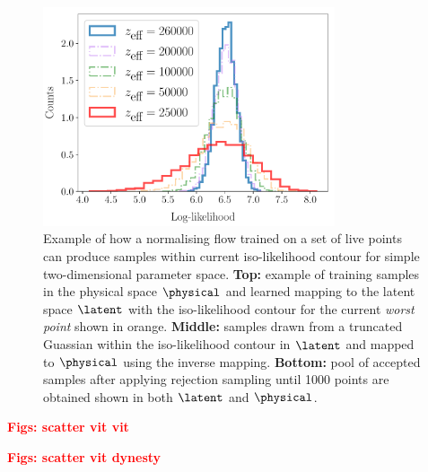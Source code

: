 \documentclass[aps,superscriptaddress,twocolumn,nopreprintnumbers,floatfix,groupedaddress]{revtex4-1}
\newcommand{\figwidth}{8.6cm}
\begin{document}
\begin{figure}
	\centering
	\includegraphics[width=\figwidth]{figs/hists_rect.pdf}
	\caption{Example of how a normalising flow trained on a set of live points can produce samples within current iso-likelihood contour for simple two-dimensional parameter space. \textbf{Top:} example of training samples in the physical space $\physical$ and learned mapping to the latent space $\latent$ with the iso-likelihood contour for the current \textit{worst point} shown in orange. \textbf{Middle:} samples drawn from a truncated Guassian within the iso-likelihood contour in $\latent$ and mapped to $\physical$ using the inverse mapping. \textbf{Bottom:} pool of accepted samples after applying rejection sampling until 1000 points are obtained shown in both $\latent$ and $\physical$.}
	\label{fig:learning_contours}
\end{figure}



\textbf{\textcolor{red}{Figs: scatter vit vit}}

\textbf{\textcolor{red}{Figs: scatter vit dynesty}}
\end{document}
